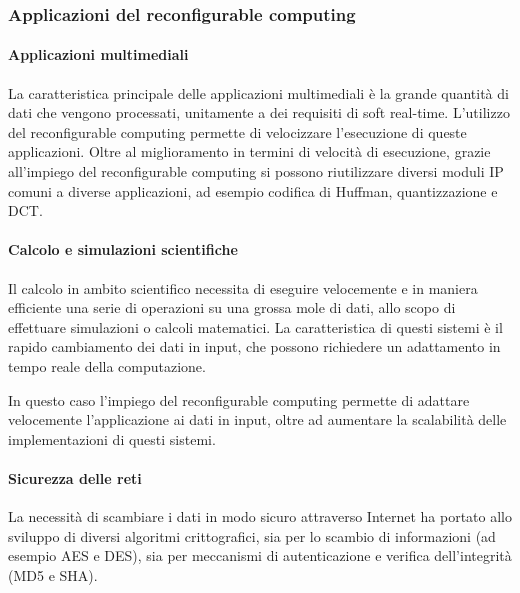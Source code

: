 

\subsubsection{Applicazioni del reconfigurable computing}
\paragraph{Applicazioni multimediali}
La caratteristica principale delle applicazioni multimediali è la grande quantità di dati che
vengono processati, unitamente a dei requisiti di soft real-time. L'utilizzo del reconfigurable
computing permette di velocizzare l'esecuzione di queste applicazioni. Oltre al miglioramento
in termini di velocità di esecuzione, grazie all'impiego del reconfigurable computing si possono
riutilizzare diversi moduli \ac{IP} comuni a diverse applicazioni, ad esempio codifica di
Huffman, quantizzazione e \ac{DCT}.

\paragraph{Calcolo e simulazioni scientifiche}
Il calcolo in ambito scientifico necessita di eseguire velocemente e in maniera efficiente
una serie di operazioni su una grossa mole di dati, allo scopo di effettuare simulazioni o
calcoli matematici. La caratteristica di questi sistemi è il rapido cambiamento dei dati in
input, che possono richiedere un adattamento in tempo reale della computazione.

In questo caso l'impiego del reconfigurable computing permette di adattare velocemente
l'applicazione ai dati in input, oltre ad aumentare la scalabilità delle implementazioni
di questi sistemi.


\paragraph{Sicurezza delle reti}
La necessità di scambiare i dati in modo sicuro attraverso Internet ha portato allo sviluppo
di diversi algoritmi crittografici, sia per lo scambio di informazioni (ad esempio
\ac{AES} e \ac{DES}), sia per meccanismi di autenticazione e verifica dell'integrità
(MD5 e \ac{SHA}).

